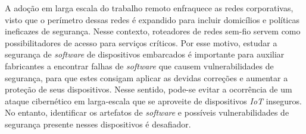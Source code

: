 


A adoção em larga escala do trabalho remoto enfraquece as redes corporativas, visto que o perímetro dessas redes é expandido para incluir domicílios e políticas ineficazes de segurança. Nesse contexto, roteadores de redes sem-fio servem como possibilitadores de acesso para serviços críticos. Por esse motivo, estudar a segurança de \textit{software} de dispositivos embarcados é importante para auxiliar fabricantes a encontrar falhas de \textit{software} que causem vulnerabilidades de segurança, para que estes consigam aplicar as devidas correções e aumentar a proteção de seus dispositivos.
Nesse sentido, pode-se evitar a ocorrência de um ataque cibernético em larga-escala que se aproveite de dispositivos \textit{IoT} inseguros. No entanto, identificar os artefatos de \textit{software} e possíveis vulnerabilidades de segurança presente nesses dispositivos é desafiador.

